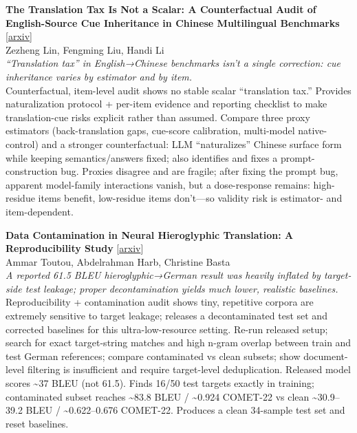 \documentclass[12pt,letterpaper]{article}
\begin{document}
\medskip

{\small\textbf{The Translation Tax Is Not a Scalar: A Counterfactual Audit of English-Source Cue Inheritance in Chinese Multilingual Benchmarks}} {\scriptsize[\href{https://arxiv.org/abs/2605.07093}{arxiv}]}\\
{\scriptsize Zezheng Lin, Fengming Liu, Handi Li}\\

{\small\textit{``Translation tax'' in English→Chinese benchmarks isn't a single correction: cue inheritance varies by estimator and by item.}}\\[1pt]
{\footnotesize Counterfactual, item-level audit shows no stable scalar ``translation tax.'' Provides naturalization protocol + per-item evidence and reporting checklist to make translation-cue risks explicit rather than assumed. Compare three proxy estimators (back-translation gaps, cue-score calibration, multi-model native-control) and a stronger counterfactual: LLM ``naturalizes'' Chinese surface form while keeping semantics/answers fixed; also identifies and fixes a prompt-construction bug. Proxies disagree and are fragile; after fixing the prompt bug, apparent model-family interactions vanish, but a dose-response remains: high-residue items benefit, low-residue items don't---so validity risk is estimator- and item-dependent.}

\medskip

{\small\textbf{Data Contamination in Neural Hieroglyphic Translation: A Reproducibility Study}} {\scriptsize[\href{https://arxiv.org/abs/2605.07453}{arxiv}]}\\
{\scriptsize Ammar Toutou, Abdelrahman Harb, Christine Basta}\\

{\small\textit{A reported 61.5 BLEU hieroglyphic→German result was heavily inflated by target-side test leakage; proper decontamination yields much lower, realistic baselines.}}\\[1pt]
{\footnotesize Reproducibility + contamination audit shows tiny, repetitive corpora are extremely sensitive to target leakage; releases a decontaminated test set and corrected baselines for this ultra-low-resource setting. Re-run released setup; search for exact target-string matches and high n-gram overlap between train and test German references; compare contaminated vs clean subsets; show document-level filtering is insufficient and require target-level deduplication. Released model scores \textasciitilde{}37 BLEU (not 61.5). Finds 16/50 test targets exactly in training; contaminated subset reaches \textasciitilde{}83.8 BLEU / \textasciitilde{}0.924 COMET-22 vs clean \textasciitilde{}30.9--39.2 BLEU / \textasciitilde{}0.622--0.676 COMET-22. Produces a clean 34-sample test set and reset baselines.}
\end{document}
